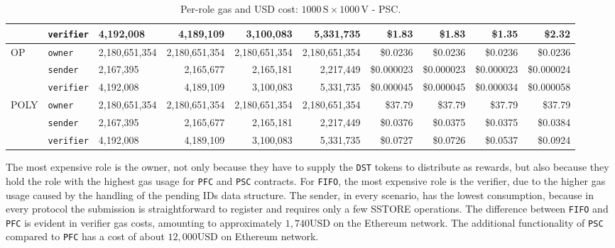 \begin{table}
{\begin{tabular}{|ll |lrrr| rrrr|}
            & \texttt{verifier} & 4,192,008     & 4,189,109     & 3,100,083     & 5,331,735     & \$1.83      & \$1.83      & \$1.35      & \$2.32      \\
            \hline
            \multirow{3}{*}{OP}   & \texttt{owner}    & 2,180,651,354 & 2,180,651,354 & 2,180,651,354 & 2,180,651,354 & \$0.0236    & \$0.0236    & \$0.0236    & \$0.0236    \\
            & \texttt{sender}   & 2,167,395     & 2,165,677     & 2,165,181     & 2,217,449     & \$0.000023  & \$0.000023  & \$0.000023  & \$0.000024  \\
            & \texttt{verifier} & 4,192,008     & 4,189,109     & 3,100,083     & 5,331,735     & \$0.000045  & \$0.000045  & \$0.000034  & \$0.000058  \\
            \hline
            \multirow{3}{*}{POLY} & \texttt{owner}    & 2,180,651,354 & 2,180,651,354 & 2,180,651,354 & 2,180,651,354 & \$37.79     & \$37.79     & \$37.79     & \$37.79     \\
            & \texttt{sender}   & 2,167,395     & 2,165,677     & 2,165,181     & 2,217,449     & \$0.0376    & \$0.0375    & \$0.0375    & \$0.0384    \\
            & \texttt{verifier} & 4,192,008     & 4,189,109     & 3,100,083     & 5,331,735     & \$0.0727    & \$0.0726    & \$0.0537    & \$0.0924    \\
            \hline
        \end{tabular}%
    }
    \caption{Per-role gas and USD cost: $1000\,\text{S} \times 1000\,\text{V}$ - PSC.}
    \label{tab:proto-evaluation-merged-psc}
\end{table}

The most expensive role is the owner, not only because they have to supply the \texttt{DST} tokens to distribute as rewards, but also because they hold the role with the highest gas usage for \texttt{PFC} and \texttt{PSC} contracts. For \texttt{FIFO}, the most expensive role is the verifier, due to the higher gas usage caused by the handling of the pending IDs data structure.
The sender, in every scenario, has the lowest consumption, because in every protocol the submission is straightforward to register and requires only a few SSTORE operations.
The difference between \texttt{FIFO} and \texttt{PFC} is evident in verifier gas costs, amounting to approximately $1,740\text{USD}$ on the Ethereum network.
The additional functionality of \texttt{PSC} compared to \texttt{PFC} has a cost of about  $12,000 \text{USD}$ on Ethereum network.



